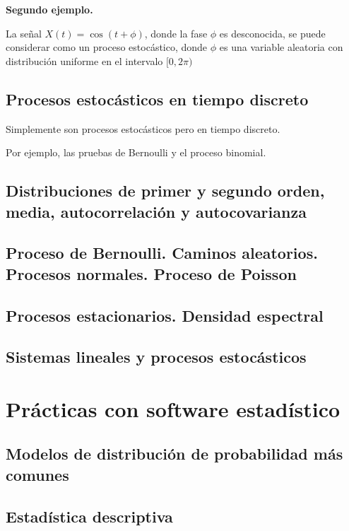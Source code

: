 \documentclass[a4paper]{book}
\begin{document}
\textbf{Segundo ejemplo.}

La señal $X(t) = \cos\left( t+\phi \right)$, donde la fase $\phi$ es desconocida, se puede considerar como un proceso estocástico, donde $\phi$ es una variable aleatoria con distribución uniforme en el intervalo $[0, 2\pi )$




\section{Procesos estocásticos en tiempo discreto}

Simplemente son procesos estocásticos pero en tiempo discreto.

Por ejemplo, las pruebas de Bernoulli y el proceso binomial.



\section{Distribuciones de primer y segundo orden, media, autocorrelación y autocovarianza}

\section{Proceso de Bernoulli. Caminos aleatorios. Procesos normales. Proceso de Poisson}

\section{Procesos estacionarios. Densidad espectral}

\section{Sistemas lineales y procesos estocásticos}

\chapter{Prácticas con software estadístico}


\section{Modelos de distribución de probabilidad más comunes}

\section{Estadística descriptiva}
\end{document}
